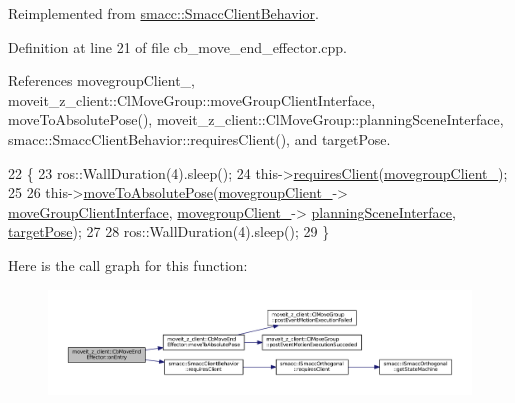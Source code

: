 Reimplemented from \hyperlink{classsmacc_1_1SmaccClientBehavior_a7962382f93987c720ad432fef55b123f}{smacc\+::\+Smacc\+Client\+Behavior}.



Definition at line 21 of file cb\+\_\+move\+\_\+end\+\_\+effector.\+cpp.



References movegroup\+Client\+\_\+, moveit\+\_\+z\+\_\+client\+::\+Cl\+Move\+Group\+::move\+Group\+Client\+Interface, move\+To\+Absolute\+Pose(), moveit\+\_\+z\+\_\+client\+::\+Cl\+Move\+Group\+::planning\+Scene\+Interface, smacc\+::\+Smacc\+Client\+Behavior\+::requires\+Client(), and target\+Pose.


\begin{DoxyCode}
22 \{
23     ros::WallDuration(4).sleep();
24     this->\hyperlink{classsmacc_1_1SmaccClientBehavior_a917f001e763a1059af337bf4e164f542}{requiresClient}(\hyperlink{classmoveit__z__client_1_1CbMoveEndEffector_af62a434c16849885a085e30b8ae70e00}{movegroupClient\_});
25 
26     this->\hyperlink{classmoveit__z__client_1_1CbMoveEndEffector_a4b77954562c23ba6d0aa0f9c805dfd8d}{moveToAbsolutePose}(\hyperlink{classmoveit__z__client_1_1CbMoveEndEffector_af62a434c16849885a085e30b8ae70e00}{movegroupClient\_}->
      \hyperlink{classmoveit__z__client_1_1ClMoveGroup_af86e046b837be0ef4afa9893d8808f20}{moveGroupClientInterface}, \hyperlink{classmoveit__z__client_1_1CbMoveEndEffector_af62a434c16849885a085e30b8ae70e00}{movegroupClient\_}->
      \hyperlink{classmoveit__z__client_1_1ClMoveGroup_a21c879b2683286aa21ce68f40195b4b5}{planningSceneInterface}, \hyperlink{classmoveit__z__client_1_1CbMoveEndEffector_abea9c6077733077baced34c6098c6140}{targetPose});
27 
28     ros::WallDuration(4).sleep();
29 \}
\end{DoxyCode}


Here is the call graph for this function\+:
\nopagebreak
\begin{figure}[H]
\begin{center}
\leavevmode
\includegraphics[width=350pt]{classmoveit__z__client_1_1CbMoveEndEffector_a5306018b432c9d8f8a31823f6b317d84_cgraph}
\end{center}
\end{figure}


